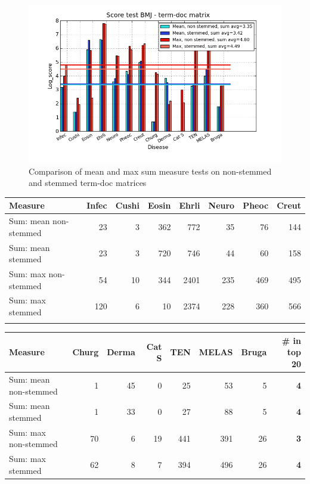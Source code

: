 \begin{figure}[H]
  \caption{Comparison of mean and max sum measure tests on non-stemmed and stemmed term-doc matrices}
  \begin{center}
    \includegraphics[width=1.2\textwidth]{barcharts/termDoc_bmj_hist_3000_ns_s_mea_max_sum.png}
  \end{center}
  \label{termDoc_bmj_hist_3000_ns_s_mea_max_sum}
\end{figure} 

\begin{table}[H]
  \begin{tiny}
    \label{testResult_termDoc_bmj_hist_3000_ns_s_mea_max_sum}
    \begin{tabular}{|l|r|r|r|r|r|r|r|}
      \hline
      Measure &Infec&Cushi&Eosin&Ehrli&Neuro&Pheoc&Creut \\
      \hline
      Sum: mean non-stemmed &23&3&362&772&35&76&144 \\
      \hline
      Sum: mean stemmed &23&3&720&746&44&60&158 \\
      \hline
      Sum: max non-stemmed &54&10&344&2401&235&469&495 \\
      \hline
      Sum: max stemmed &120&6&10&2374&228&360&566 \\
      \hline
      \multicolumn{8}{c}{} \\
    \end{tabular}
    \begin{tabular}{|l|r|r|r|r|r|r|r|}
      \hline
      Measure &Churg&Derma&Cat S&TEN&MELAS&Bruga& \scriptsize{\textbf{\# in top 20}} \\
      \hline
      Sum: mean non-stemmed &1&45&0&25&53&5 &\scriptsize{\textbf{4}} \\
      \hline
      Sum: mean stemmed &1&33&0&27&88&5 &\scriptsize{\textbf{4}}\\
      \hline
      Sum: max non-stemmed &70&6&19&441&391&26 & \scriptsize{\textbf{3}} \\
      \hline
      Sum: max stemmed &62&8&7&394&496&26 & \scriptsize{\textbf{4}} \\
      \hline
    \end{tabular}
  \end{tiny}
\end{table}

